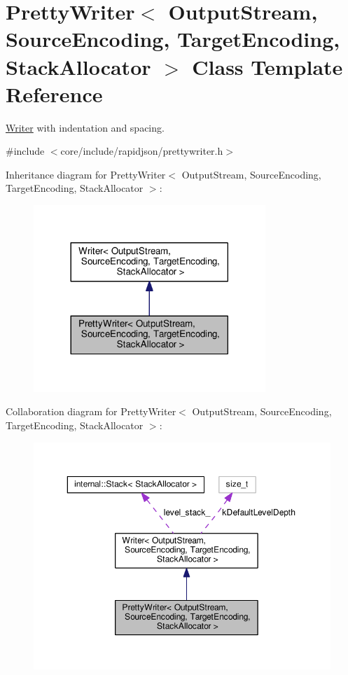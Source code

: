 \hypertarget{classPrettyWriter}{}\section{Pretty\+Writer$<$ Output\+Stream, Source\+Encoding, Target\+Encoding, Stack\+Allocator $>$ Class Template Reference}
\label{classPrettyWriter}


\hyperlink{classWriter}{Writer} with indentation and spacing.  




{\ttfamily \#include $<$core/include/rapidjson/prettywriter.\+h$>$}



Inheritance diagram for Pretty\+Writer$<$ Output\+Stream, Source\+Encoding, Target\+Encoding, Stack\+Allocator $>$\+:
\nopagebreak
\begin{figure}[H]
\begin{center}
\leavevmode
\includegraphics[width=248pt]{classPrettyWriter__inherit__graph}
\end{center}
\end{figure}


Collaboration diagram for Pretty\+Writer$<$ Output\+Stream, Source\+Encoding, Target\+Encoding, Stack\+Allocator $>$\+:
\nopagebreak
\begin{figure}[H]
\begin{center}
\leavevmode
\includegraphics[width=350pt]{classPrettyWriter__coll__graph}
\end{center}
\end{figure}
